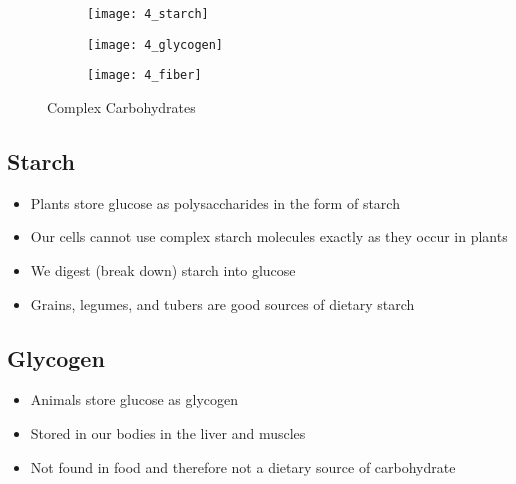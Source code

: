 \documentclass[title={Chapter 4}]{fdsn201notes}
\begin{document}
\begin{figure}[H]
	\centering
	\begin{subfigure}[b]{0.3\textwidth}
		\centering
		\texttt{[image: 4\_starch]}
		\caption{}
		\label{fig:starch}
	\end{subfigure}
	\begin{subfigure}[b]{0.3\textwidth}
		\centering
		\texttt{[image: 4\_glycogen]}
		\caption{}
		\label{fig:glycogen}
	\end{subfigure}
	\begin{subfigure}[b]{0.3\textwidth}
		\centering
		\texttt{[image: 4\_fiber]}
		\caption{}
		\label{fig:fiber}
	\end{subfigure}
	\caption{Complex Carbohydrates}
	\label{fig:complex-carbohydrates}
\end{figure}

\subsection{Starch}\label{subsec:starch}
\begin{itemize}
	\item Plants store glucose as polysaccharides in the form of starch
	\item Our cells cannot use complex starch molecules exactly as they occur in plants
	\item We digest (break down) starch into glucose
	\item Grains, legumes, and tubers are good sources of dietary starch
\end{itemize}

\subsection{Glycogen}\label{subsec:glycogen}
\begin{itemize}
	\item Animals store glucose as glycogen
	\item Stored in our bodies in the liver and muscles
	\item Not found in food and therefore not a dietary source of carbohydrate
\end{itemize}
\end{document}
